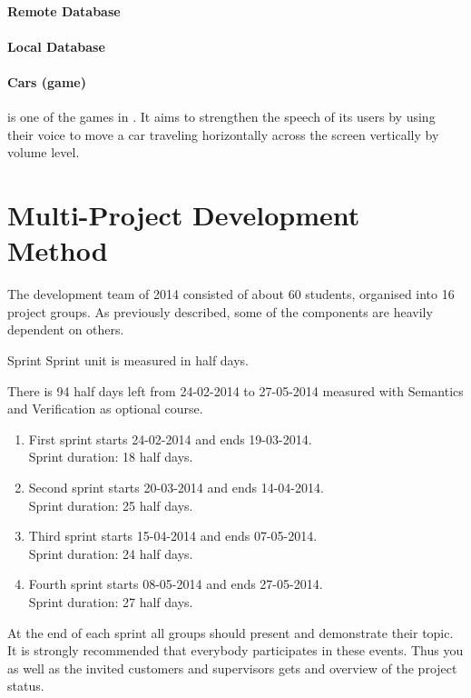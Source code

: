 \paragraph{Remote Database}

\paragraph{Local Database}

\paragraph{Cars (game)}
is one of the games in \giraf.
It aims to strengthen the speech of its users by using their voice to move a car traveling horizontally across the screen vertically by volume level.



\section{Multi-Project Development Method}\label{sec:giraf:development}
The \giraf development team of 2014 consisted of about 60 students, organised into 16 project groups. As previously described, some of the \giraf components are heavily dependent on others. 



Sprint
Sprint unit is measured in half days.

There is 94 half days left from 24-02-2014 to 27-05-2014 measured with Semantics and Verification as optional course.

\begin{enumerate}
\item First sprint starts 24-02-2014 and ends 19-03-2014.\\
Sprint duration: 18 half days.
\item Second sprint starts 20-03-2014 and ends 14-04-2014.\\
Sprint duration: 25 half days.
\item Third sprint starts 15-04-2014 and ends 07-05-2014.\\
Sprint duration: 24 half days.
\item Fourth sprint starts 08-05-2014 and ends 27-05-2014.\\
Sprint duration: 27 half days.
\end{enumerate}

At the end of each sprint all groups should present and demonstrate their topic.
It is strongly recommended that everybody participates in these events. Thus you as well as the invited customers and supervisors gets and overview of the project status.